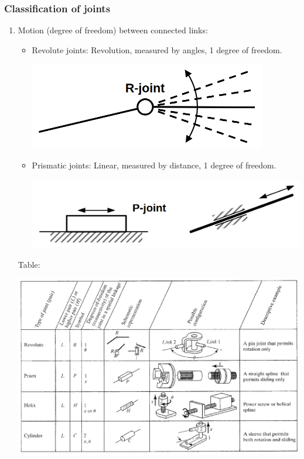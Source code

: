 \documentclass[11pt]{article}
\begin{document}
\subsubsection{Classification of joints}
\label{sec:org051fa8a}
\begin{enumerate}
\item Motion (degree of freedom) between connected links:
\begin{itemize}
\item Revolute joints: Revolution, measured by angles, 1 degree of freedom.
\begin{center}
\includegraphics[width=.9\linewidth]{./images/revolute-joint-image.png}
\end{center}

\item Prismatic joints: Linear, measured by distance, 1 degree of freedom.
\begin{center}
\includegraphics[width=.9\linewidth]{./images/prismatic-joint-image.png}
\end{center}
\end{itemize}

Table:
\begin{center}
\includegraphics[width=.9\linewidth]{./images/types-of-joints-table.png}
\end{center}
\end{enumerate}
\end{document}
